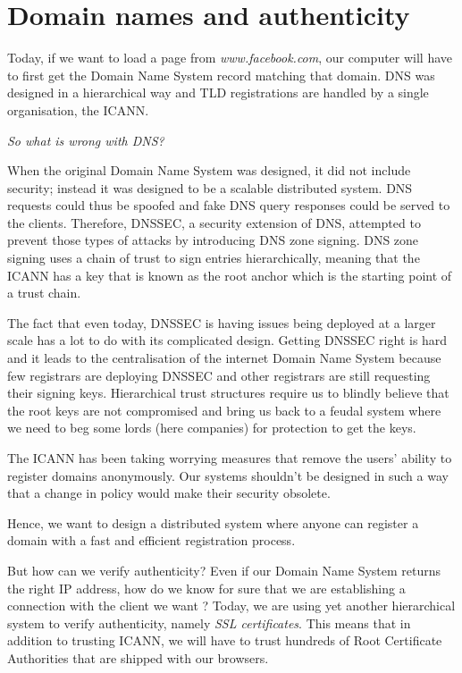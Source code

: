 \documentclass{vldb}
\begin{document}
\section{Domain names and authenticity}

Today, if we want to load a page from \emph{www.facebook.com}, our computer will have to first get the Domain Name System record matching that domain. DNS was designed in a hierarchical way and TLD registrations are handled by a single organisation, the ICANN.

\emph{So what is wrong with DNS?}

When the original Domain Name System was designed, it did not include security; instead it was designed to be a scalable distributed system. DNS requests could thus be spoofed and fake DNS query responses could be served to the clients. Therefore, DNSSEC, a security extension of DNS, attempted to prevent those types of attacks by introducing DNS zone signing. DNS zone signing uses a chain of trust to sign entries hierarchically,  meaning that the ICANN has a key that is known as the root anchor which is the starting point of a trust chain.

The fact that even today, DNSSEC is having issues being deployed at a larger scale has a lot to do with its complicated design. Getting DNSSEC right is hard and it leads to the centralisation of the internet Domain Name System because few registrars are deploying DNSSEC and other registrars are still requesting their signing keys. Hierarchical trust structures require us to blindly believe that the root keys are not compromised and bring us back to a feudal system where we need to beg some lords (here companies) for protection to get the keys.

The ICANN has been taking worrying measures that remove the users' ability to register domains anonymously\cite{icannabuse}. Our systems shouldn't be designed in such a way that a change in policy would make their security obsolete. 

Hence, we want to design a distributed system where anyone can register a domain with a fast and efficient registration process.

But how can we verify authenticity? 
Even if our Domain Name System returns the right IP address, how do we know for sure that we are establishing a connection with the client we want ? Today, we are using yet another hierarchical system to verify authenticity, namely \emph{SSL certificates}. This means that in addition to trusting ICANN, we will have to trust hundreds of Root Certificate Authorities that are shipped with our browsers.\cite{mozillaSSL}
\end{document}
